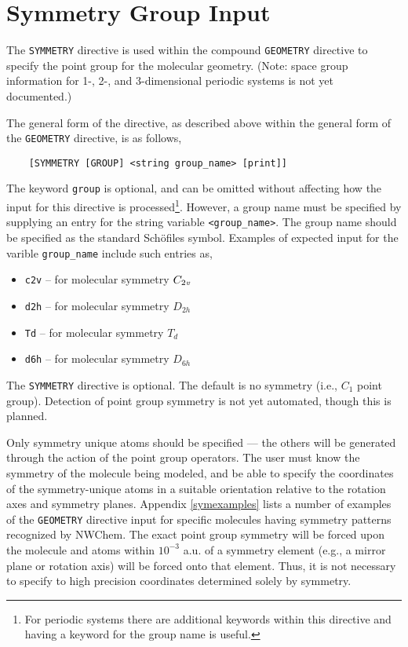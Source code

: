 \section{Symmetry Group Input}

The \verb+SYMMETRY+ directive is used within the compound \verb+GEOMETRY+
directive to specify the point group for the
molecular geometry. (Note: space group information for 1-, 2-, and
3-dimensional periodic systems is not yet documented.)

The general form of the directive, as described above within the general
form of the \verb+GEOMETRY+ directive, is as follows,
\begin{verbatim}
    [SYMMETRY [GROUP] <string group_name> [print]]
\end{verbatim}
The keyword \verb+group+ is optional, and can be omitted without affecting
how the input for this directive is processed\footnote{For periodic
  systems there are additional keywords within this directive and having
  a keyword for the group name is useful.}.
However, a group name must be specified by supplying an entry for the
string variable \verb+<group_name>+.  The
group name should be specified as the standard Sch\"{o}files symbol.
Examples of expected input for the varible \verb+group_name+ include
such entries as,

\begin{itemize}
\item \verb+c2v+ -- for molecular symmetry $C_{2{\it v}}$
\item \verb+d2h+ -- for molecular symmetry $D_{2h}$
\item \verb+Td+ -- for molecular symmetry $T_d$
\item \verb+d6h+ -- for molecular symmetry $D_{6h}$
\end{itemize}

The \verb+SYMMETRY+ directive is optional.  The default is no symmetry 
(i.e., $C_1$ point group). Detection of point
group symmetry is not yet automated, though this is planned.  

Only symmetry unique atoms should be specified --- the others will be
generated through the action of the point group operators.  The user
must know the symmetry of the molecule being modeled, and be able to
specify the coordinates of the symmetry-unique atoms in a suitable
orientation relative to the rotation axes and symmetry planes.
Appendix \ref{symexamples} lists a number of examples of the
\verb+GEOMETRY+ directive input for specific molecules having symmetry
patterns recognized by NWChem.  The exact point group symmetry will be
forced upon the molecule and atoms within $10^{-3}$ a.u. of a symmetry
element (e.g., a mirror plane or rotation axis) will be forced onto
that element.  Thus, it is not necessary to specify to high precision
coordinates determined solely by symmetry.

